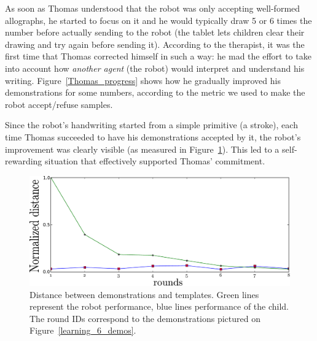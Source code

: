 \documentclass[10pt,a4paper]{article}
\begin{document}
As soon as Thomas understood that the robot was only accepting well-formed
allographs, he started to focus on it and he would typically draw 5 or 6 times
the number before actually sending to the robot (the tablet lets children
clear their drawing and try again before sending it). According to
the therapist, it was the first time that Thomas corrected himself in such a
way: he mad the effort to take into account how \emph{another agent} (the robot) would
interpret and understand his writing. Figure~\ref{Thomas_progress} shows how
he gradually improved his demonstrations for some numbers, according to the
metric we used to make the robot accept/refuse samples.

Since the robot's handwriting started from a simple primitive (a stroke), each
time Thomas succeeded to have his demonstrations accepted by it, the robot's
improvement was clearly visible (as measured in Figure~\ref{Thomas_distances}).
This led to a self-rewarding situation that effectively supported Thomas'
commitment.

\begin{figure}[!]
    \centering
    \includegraphics[width=0.5\linewidth]{learning_6_distances}
    \caption{\small Distance between demonstrations and templates. Green lines represent the robot performance,
blue lines performance of the child. The round IDs correspond to the demonstrations
pictured on Figure~\ref{learning_6_demos}.}
    \label{Thomas_distances}
\end{figure}
\end{document}
